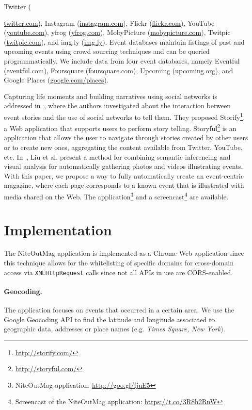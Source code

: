 \documentclass[runningheads,a4paper]{llncs}
\begin{document}
Twitter ({\url{twitter.com}),
Instagram (\url{instagram.com}),
Flickr (\url{flickr.com}),
YouTube (\url{youtube.com}),
yfrog (\url{yfrog.com}),
MobyPicture (\url{mobypicture.com}),
Twitpic (\url{twitpic.com}), and
\mbox{img.ly} (\url{img.ly}).
Event databases maintain listings of past and upcoming events using crowd sourcing techniques and can be queried programmatically. We include data from four event databases, namely Eventful (\url{eventful.com}), Foursquare (\url{foursquare.com}), Upcoming (\url{upcoming.org}), and Google Places (\url{google.com/places}).

Capturing life moments and building narratives using social networks is addressed in~\cite{Atosy2011}, where the authors investigated about the interaction between event stories and the use of social networks to tell them. They proposed Storify\footnote{\url{http://storify.com/}}, a Web application that supports users to perform story telling. Storyful\footnote{\url{http://storyful.com/}} is an application that allows the user to navigate through stories created by other users or to create new ones, aggregating the content available from Twitter, YouTube, etc. In~\cite{Liu2011}, Liu et al. present a method for combining semantic inferencing and visual analysis for automatically gathering photos and videos illustrating events. With this paper, we propose a way to fully automatically create an event-centric magazine, where each page corresponds to a known event that is illustrated with media shared on the Web. The application\footnote{NiteOutMag application: \url{http://goo.gl/fjuE5}} and a screencast\footnote{Screencast of the NiteOutMag application: \url{https://t.co/3R8h2RnW}} are available.


\section{Implementation}                                                    \label{sec:implementation}
The NiteOutMag application is implemented as a Chrome Web application since this technique allows for the whitelisting of specific domains for cross-domain access via \texttt{XMLHttpRequest} calls since not all APIs in use are CORS-enabled.

\paragraph{Geocoding.} The application focuses on events that occurred in a certain area. We use the Google Geocoding API to find the latitude and longitude associated to geographic data, addresses or place names (e.g. \emph{Times Square, New York}).

}
\end{document}
